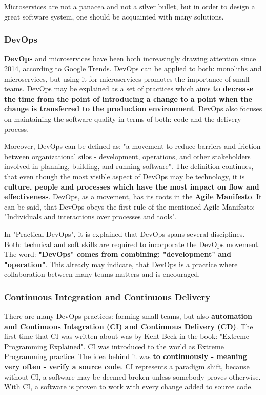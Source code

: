 Microservices are not a panacea\cite{book-cndwk} and not a silver bullet\cite{article-micro-devops}, but in order to design a great software system, one should be acquainted with many solutions.

\subsubsection{DevOps}
\textbf{DevOps} and microservices have been both increasingly drawing attention since 2014, according to Google Trends. DevOps can be applied to both: monoliths and microservices, but using it for microservices promotes the importance of small teams. DevOps may be explained as a set of practices which aims \textbf{to decrease the time from the point of introducing a change to a point when the change is transferred to the production environment}. DevOps also focuses on maintaining the software quality in terms of both: code and the delivery process\cite{article-micro-devops}.

Moreover, DevOps can be defined as: "a movement to reduce barriers and friction between organizational silos - development, operations, and other stakeholders involved in planning, building, and running software". The definition continues, that even though the most visible aspect of DevOps may be technology, it is \textbf{culture, people and processes which have the most impact on flow and effectiveness}\cite{book-iac}. DevOps, as a movement, has its roots in the \textbf{Agile Manifesto}. It can be said, that DevOps obeys the first rule of the mentioned Agile Manifesto: "Individuals and interactions over processes and tools"\cite{book-pr-devops}.

In "Practical DevOps"\cite{book-pr-devops}, it is explained that DevOps spans several disciplines. Both: technical and soft skills are required to incorporate the DevOps movement. The word: \textbf{"DevOps" comes from combining: "development" and "operation"}. This already may indicate, that DevOps is a practice where collaboration between many teams matters and is encouraged.

\subsubsection{Continuous Integration and Continuous Delivery}
There are many DevOps practices: forming small teams, but also \textbf{automation and Continuous Integration (CI) and Continuous Delivery (CD)}\cite{book-pr-devops}\cite{article-micro-devops}. The first time that CI was written about was by Kent Beck in the book: "Extreme Programming Explained". CI was introduced to the world as Extreme Programming practice. The idea behind it was \textbf{to continuously - meaning very often - verify a source code}. CI represents a paradigm shift, because without CI, a software may be deemed broken unless somebody proves otherwise. With CI, a software is proven to work with every change added to source code\cite{book-cicd}.

